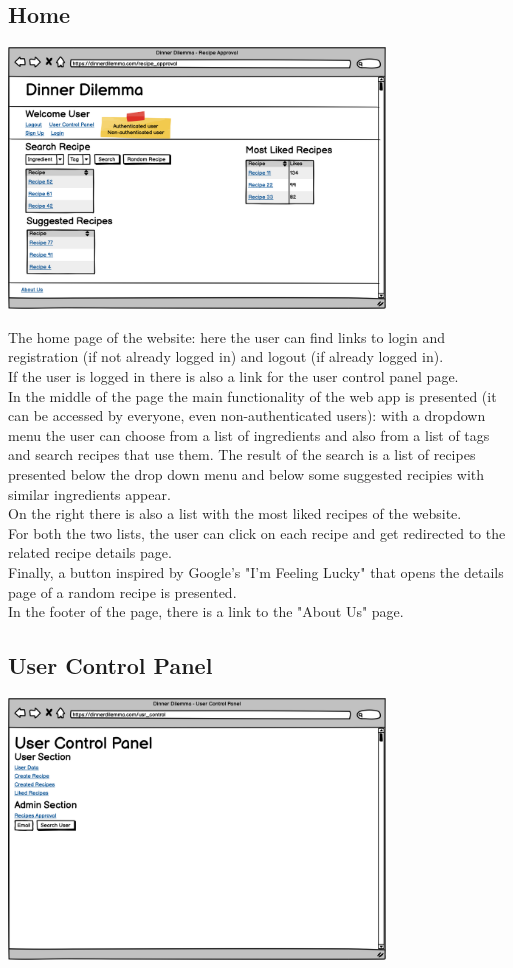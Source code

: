 \subsection{Home}
\includegraphics[width=0.75\textwidth]{images/home.png}

The home page of the website: here the user can find links to login and registration (if not already logged in) and logout (if already logged in).\\
If the user is logged in there is also a link for the user control panel page.\\
In the middle of the page the main functionality of the web app is presented (it can be accessed by everyone, even non-authenticated users): with a dropdown menu the user can choose from a list of ingredients and also from a list of tags and search recipes that use them. The result of the search is a list of recipes presented below the drop down menu and below some suggested recipies with similar ingredients appear.\\
On the right there is also a list with the most liked recipes of the website.\\
For both the two lists, the user can click on each recipe and get redirected to the related recipe details page.\\
Finally, a button inspired by Google's "I'm Feeling Lucky" that opens the details page of a random recipe is presented.\\
In the footer of the page, there is a link to the "About Us" page.



\subsection{User Control Panel}
\includegraphics[width=0.75\textwidth]{images/usercontrolpanel.png}

